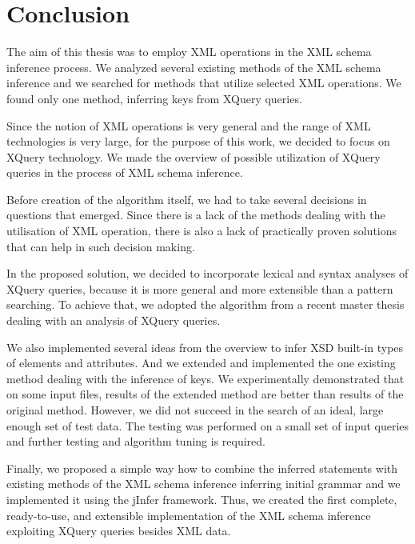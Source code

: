 \chapter{Conclusion}
The aim of this thesis was to employ XML operations in the XML schema inference process. We analyzed several existing methods of the XML schema inference and we searched for methods that utilize selected XML operations. We found only one method, inferring keys from XQuery queries.

Since the notion of XML operations is very general and the range of XML technologies is very large, for the purpose of this work, we decided to focus on XQuery technology. We made the overview of possible utilization of XQuery queries in the process of XML schema inference.

Before creation of the algorithm itself, we had to take several decisions in questions that emerged. Since there is a lack of the methods dealing with the utilisation of XML operation, there is also a lack of practically proven solutions that can help in such decision making.

In the proposed solution, we decided to incorporate lexical and syntax analyses of XQuery queries, because it is more general and more extensible than a pattern searching. To achieve that, we adopted the algorithm from a recent master thesis dealing with an analysis of XQuery queries.

We also implemented several ideas from the overview to infer XSD built-in types of elements and attributes. And we extended and implemented the one existing method dealing with the inference of keys. We experimentally demonstrated that on some input files, results of the extended method are better than results of the original method. However, we did not succeed in the search of an ideal, large enough set of test data. The testing was performed on a small set of input queries and further testing and algorithm tuning is required.

Finally, we proposed a simple way how to combine the inferred statements with existing methods of the XML schema inference inferring initial grammar and we implemented it using the jInfer framework. Thus, we created the first complete, ready-to-use, and extensible implementation of the XML schema inference exploiting XQuery queries besides XML data.

